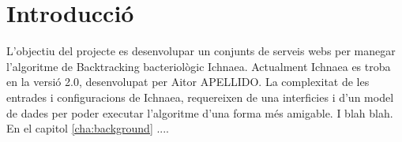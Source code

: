 
\chapter*{Introducci\'{o}}

L'objectiu del projecte es desenvolupar un conjunts de serveis webs per manegar l'algoritme de Backtracking bacteriol\`{o}gic Ichnaea. Actualment Ichnaea es troba en la versi\'{o} 2.0, desenvolupat per Aitor APELLIDO. La complexitat de les entrades i configuracions de Ichnaea, requereixen de una interficies i d'un model de dades per poder executar l'algoritme d'una forma m\'{e}s amigable. I blah blah. \\

En el capitol \ref{cha:background} ....\\


